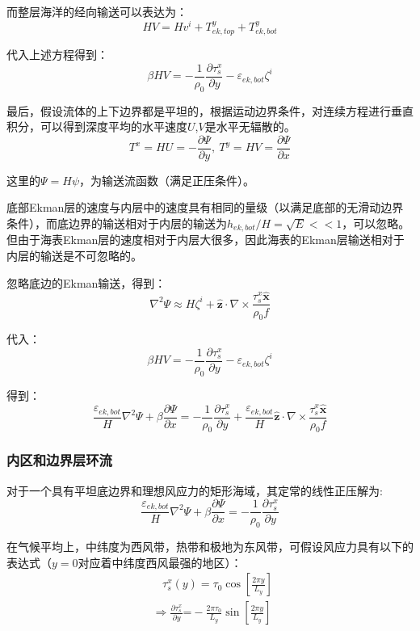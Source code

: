 \documentclass{article}
\begin{document}
而整层海洋的经向输送可以表达为：
$$HV=H{{v}^{i}}+T_{ek,top}^{y}+T_{ek,bot}^{y}$$

代入上述方程得到：
$$\beta HV=-\frac{1}{{{\rho }_{0}}}\frac{\partial \tau _{s}^{x}}{\partial y}-{{\varepsilon }_{ek,bot}}{{\zeta }^{i}}$$

最后，假设流体的上下边界都是平坦的，根据运动边界条件，对连续方程进行垂直积分，可以得到深度平均的水平速度$U$,$V$是水平无辐散的。
$${{T}^{x}}=HU=-\frac{\partial \Psi }{\partial y},\ {{T}^{y}}=HV=\frac{\partial \Psi }{\partial x}$$

这里的$\Psi = H\psi$，为输送流函数（满足正压条件）。

底部Ekman层的速度与内层中的速度具有相同的量级（以满足底部的无滑动边界条件），而底边界的输送相对于内层的输送为$h_{ek,bot}/H=\sqrt{E}<<1$，可以忽略。但由于海表Ekman层的速度相对于内层大很多，因此海表的Ekman层输送相对于内层的输送是不可忽略的。

忽略底边的Ekman输送，得到：
$${{\nabla }^{2}}\Psi \approx H{{\zeta }^{i}}+\mathbf{\hat{z}}\cdot \nabla \times \frac{\tau _{s}^{x}\mathbf{\hat{x}}}{{{\rho }_{0}}f}$$

代入：
$$\beta HV=-\frac{1}{{{\rho }_{0}}}\frac{\partial \tau _{s}^{x}}{\partial y}-{{\varepsilon }_{ek,bot}}{{\zeta }^{i}}$$

得到：
$$\frac{{{\varepsilon }_{ek,bot}}}{H}{{\nabla }^{2}}\Psi +\beta \frac{\partial \Psi }{\partial x}=-\frac{1}{{{\rho }_{0}}}\frac{\partial \tau _{s}^{x}}{\partial y}+\frac{{{\varepsilon }_{ek,bot}}}{H}\mathbf{\hat{z}}\cdot \nabla \times \frac{\tau _{s}^{x}\mathbf{\hat{x}}}{{{\rho }_{0}}f}$$

\subsubsection{内区和边界层环流}
对于一个具有平坦底边界和理想风应力的矩形海域，其定常的线性正压解为:
$$\frac{{{\varepsilon }_{ek,bot}}}{H}{{\nabla }^{2}}\Psi +\beta \frac{\partial \Psi }{\partial x}=-\frac{1}{{{\rho }_{0}}}\frac{\partial \tau _{s}^{x}}{\partial y}$$

在气候平均上，中纬度为西风带，热带和极地为东风带，可假设风应力具有以下的表达式（$y=0$对应着中纬度西风最强的地区）：
\begin{align}
  & \ \ \ \ \tau _{s}^{x}(y)={{\tau }_{0}}\cos \left[ \frac{2\pi y}{{{L}_{y}}} \right] \\ 
 & \Rightarrow \frac{\partial \tau _{s}^{x}}{\partial y}\text{=}-\frac{2\pi {{\tau }_{0}}}{{{L}_{y}}}\sin\left[ \frac{2\pi y}{{{L}_{y}}} \right]\ \  
\end{align}
\end{document}

